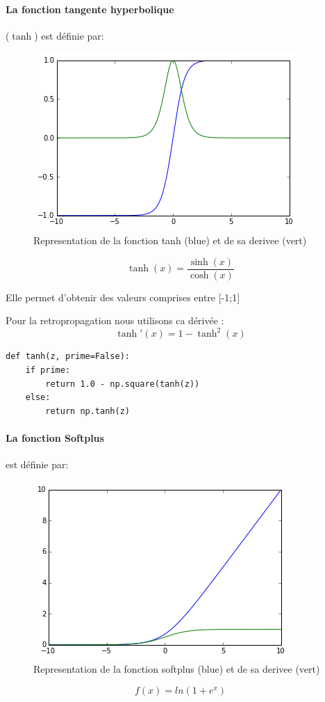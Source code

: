 \documentclass[11pt]{article}
\begin{document}
\paragraph{La fonction tangente hyperbolique}($\tanh$) est d\'efinie par:
\begin{figure}[htp]
	\centering
	\includegraphics[scale=.5]{img/act_tanh.png}
	\caption{Representation de la fonction tanh (blue) et de sa derivee (vert)}
\end{figure}
\begin{equation}
		\tanh(x)=\frac{\sinh(x)}{\cosh(x)}
\end{equation}

Elle permet d'obtenir des valeurs comprises entre [-1;1]

Pour la retropropagation nous utilisons ca d\'eriv\'ee :
\begin{equation}
		\tanh'(x)=1-\tanh^2(x)
\end{equation}

\begin{lstlisting}
def tanh(z, prime=False):
    if prime:
		return 1.0 - np.square(tanh(z))
	else:
		return np.tanh(z)
\end{lstlisting}


\paragraph{La fonction Softplus} est d\'efinie par:
\begin{figure}[htp]
	\centering
	\includegraphics[scale=.5]{img/act_softplus.png}
	\caption{Representation de la fonction softplus (blue) et de sa derivee (vert)}
\end{figure}
\begin{equation}
		f(x)=ln(1+e^x)
\end{equation}
\end{document}
